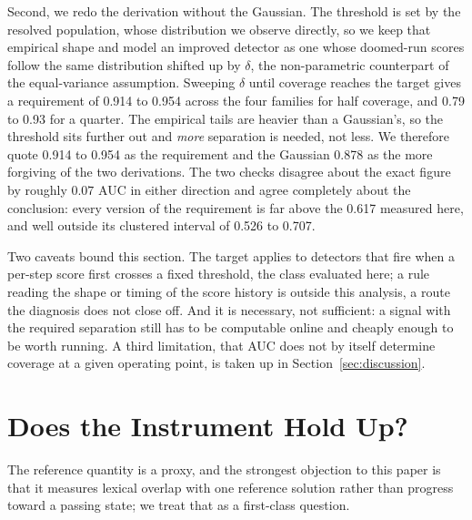 \documentclass[sigconf,screen]{acmart}
\begin{document}
Second, we redo the derivation without the Gaussian. The threshold is set by the resolved
population, whose distribution we observe directly, so we keep that empirical shape and model an
improved detector as one whose doomed-run scores follow the same distribution shifted up by
$\delta$, the non-parametric counterpart of the equal-variance assumption. Sweeping $\delta$ until
coverage reaches the target gives a requirement of 0.914 to 0.954 across the four families for half
coverage, and 0.79 to 0.93 for a quarter. The empirical tails are heavier than a Gaussian's, so the
threshold sits further out and \emph{more} separation is needed, not less. We therefore quote 0.914
to 0.954 as the requirement and the Gaussian 0.878 as the more forgiving of the two derivations. The two checks disagree about the exact figure by roughly
$0.07$ AUC in either direction and agree completely about the conclusion: every version of the
requirement is far above the 0.617 measured here, and well outside its clustered interval of 0.526
to 0.707.

Two caveats bound this section. The target applies to detectors that fire when a per-step score
first crosses a fixed threshold, the class evaluated here; a rule reading the shape or timing of the
score history is outside this analysis, a route the diagnosis does not close off. And it is
necessary, not sufficient: a signal with the required separation still has to be computable online
and cheaply enough to be worth running. A third limitation, that AUC does not by itself determine
coverage at a given operating point, is taken up in Section~\ref{sec:discussion}.

\section{Does the Instrument Hold Up?}
\label{sec:oracle}
The reference quantity is a proxy, and the strongest objection to this paper is that it measures
lexical overlap with one reference solution rather than progress toward a passing state; we treat
that as a first-class question.
\end{document}
